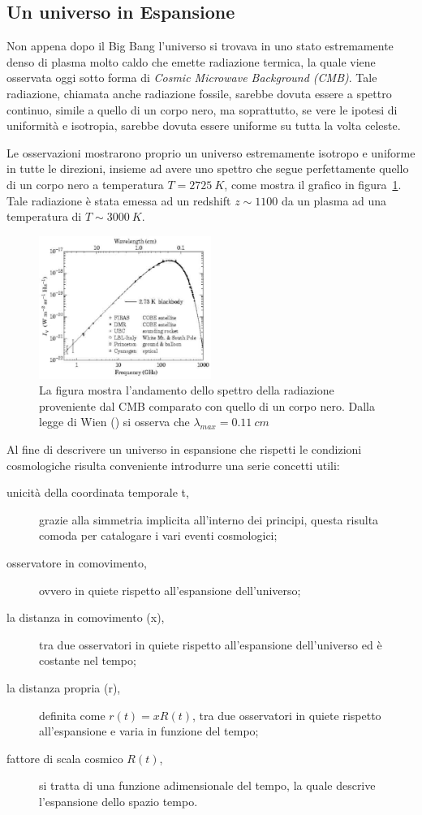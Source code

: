\subsection{Un universo in Espansione}\label{sec:unverso-espansione}
Non appena dopo il Big Bang l'universo si trovava in uno stato estremamente denso di plasma molto caldo che emette radiazione termica, la quale viene osservata oggi sotto forma di \textit{Cosmic Microwave Background (CMB)}. Tale radiazione, chiamata anche radiazione fossile, sarebbe dovuta essere a spettro continuo, simile a quello di un corpo nero, ma soprattutto, se vere le ipotesi di uniformità e isotropia, sarebbe dovuta essere uniforme su tutta la volta celeste. 

Le osservazioni mostrarono proprio un universo estremamente isotropo e uniforme in tutte le direzioni, insieme ad avere uno spettro che segue perfettamente quello di un corpo nero a temperatura $T = \SI{2725}{K}$, come mostra il grafico in figura~\ref{fig:balckbody-universe}. Tale radiazione è stata emessa ad un redshift $z \sim 1100$ da un plasma ad una temperatura di $T \sim \SI{3000}{K}$.
\begin{figure}
    \centering
    \includegraphics[width = 0.5\textwidth]{immagini/blackbody-universe.jpg}
    \caption{La figura mostra l'andamento dello spettro della radiazione proveniente dal CMB comparato con quello di un corpo nero. Dalla legge di Wien () si osserva che $\lambda_{max}= \SI{0.11}{cm}$}\label{fig:balckbody-universe}
\end{figure}

Al fine di descrivere un universo in espansione che rispetti le condizioni cosmologiche risulta conveniente introdurre una serie concetti utili:
\begin{description}
    \item[unicità della coordinata temporale t,] grazie alla simmetria implicita all'interno dei principi, questa risulta comoda per catalogare i vari eventi cosmologici;
    \item[osservatore in comovimento,] ovvero in quiete rispetto all'espansione dell'universo;
    \item[la distanza in comovimento (x),] tra due osservatori in quiete rispetto all'espansione dell'universo ed è costante nel tempo;
    \item[la distanza propria (r),] definita come $r(t) = x R(t)$, tra due osservatori in quiete rispetto all'espansione e varia in funzione del tempo;
    \item[fattore di scala cosmico $R(t)$,] si tratta di una funzione adimensionale del tempo, la quale descrive l'espansione dello spazio tempo.
\end{description}

